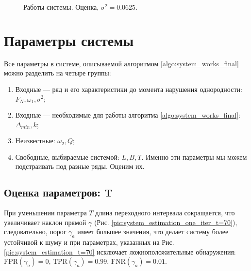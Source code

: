 \documentclass[specialist, substylefile = spbu.rtx,
			   subf, href, 12pt]{disser}
\begin{document}
\begin{figure}[!hhh]
	\caption{Работы системы. Оценка, $ \sigma^2=0.0625 $.}
	\label{pic:system_estimation_small_sd}
\end{figure}



\section{Параметры системы}\label{sec:system_parameters}

Все параметры в системе, описываемой алгоритмом \ref{algo:system_works_final} можно разделить на четыре группы:
\begin{enumerate}
	\item Входные --- ряд и его характеристики до момента нарушения однородности: \newline $ F_N, \omega_1, \sigma^2 $;
	\item Входные --- необходимые для работы алгоритма \ref{algo:system_works_final}: $ \Delta_{min}, k $;
	\item Неизвестные: $ \omega_2, Q $;
	\item Свободные, выбираемые системой: $ L, B, T $. Именно эти параметры мы можем подстраивать под разные ряды. Оценим их.
\end{enumerate}

\subsection{Оценка параметров: T}

При уменьшении параметра $ T $ длина переходного интервала сокращается, что увеличивает наклон прямой $ \gamma $ (Рис. \ref{pic:system_estimation_one_iter_t=70}), следовательно, порог $ \gamma_a $ имеет большее значения, что делает систему более устойчивой к шуму и при параметрах, указанных на Рис. \ref{pic:system_estimation_t=70} исключает ложноположительные обнаружения: $ \mathrm{FPR}(\gamma_a) = 0 $, $ \mathrm{TPR}(\gamma_a) = 0.99 $,  $ \mathrm{FNR}(\gamma_a) = 0.01 $.
\end{document}
